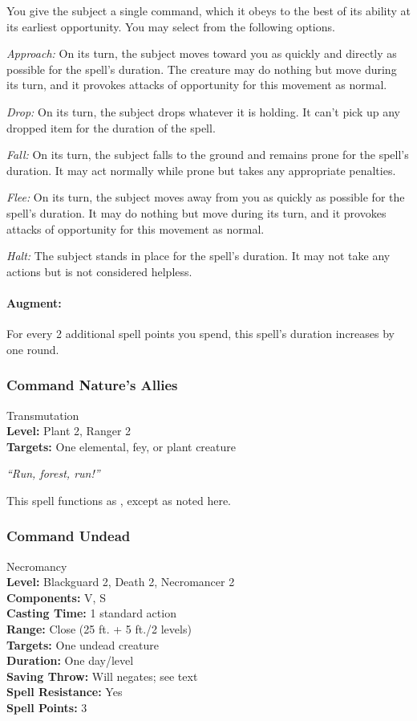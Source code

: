 You give the subject a single command, which it obeys to the best of its ability at its earliest opportunity. You may select from the following options.

\begin{list}{}{\leftmargin=1em}
 \item \emph{Approach:}
On its turn, the subject moves toward you as quickly and directly as possible for the spell's duration. 
The creature may do nothing but move during its turn, and it provokes attacks of opportunity for this movement as normal.
 \item \emph{Drop:}
On its turn, the subject drops whatever it is holding. 
It can't pick up any dropped item for the duration of the spell.
 \item \emph{Fall:}
On its turn, the subject falls to the ground and remains prone for the spell's duration. 
It may act normally while prone but takes any appropriate penalties.
 \item \emph{Flee:}
On its turn, the subject moves away from you as quickly as possible for the spell's duration. 
It may do nothing but move during its turn, and it provokes attacks of opportunity for this movement as normal.
 \item \emph{Halt:}
The subject stands in place for the spell's duration. 
It may not take any actions but is not considered helpless.
\end{list}
\paragraph{Augment:} For every 2 additional spell points you spend, this spell's duration increases by one round.
\subsubsection{Command Nature's Allies}
\label{Spell:CommandNaturesAllies}
Transmutation
\\ \textbf{Level:} Plant 2, Ranger 2
\\ \textbf{Targets:} One elemental, fey, or plant creature

\emph{``Run, forest, run!''}

This spell functions as , except as noted here.
\subsubsection{Command Undead}
\label{Spell:CommandUndead}
Necromancy
\\ \textbf{Level:} Blackguard 2, Death 2, Necromancer 2
\\ \textbf{Components:} V, S
\\ \textbf{Casting Time:} 1 standard action
\\ \textbf{Range:} Close (25 ft. + 5 ft./2 levels)
\\ \textbf{Targets:} One undead creature
\\ \textbf{Duration:} One day/level
\\ \textbf{Saving Throw:} Will negates; see text
\\ \textbf{Spell Resistance:} Yes
\\ \textbf{Spell Points:} 3

